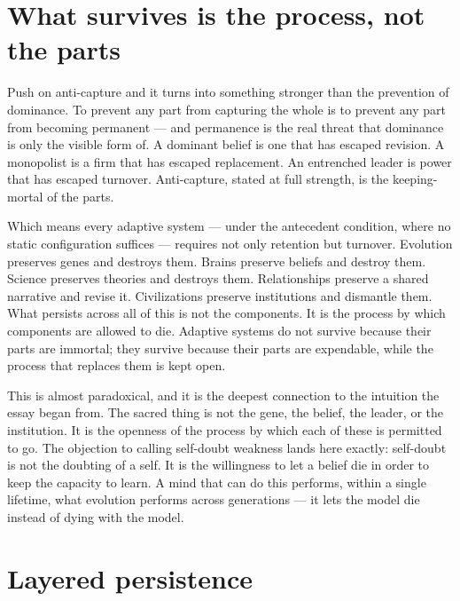 \documentclass[11pt, a4paper]{report}
\begin{document}
\section{What survives is the process, not the parts}

Push on anti-capture and it turns into something stronger than the prevention of dominance. To prevent any part from capturing the whole is to prevent any part from becoming permanent --- and permanence is the real threat that dominance is only the visible form of. A dominant belief is one that has escaped revision. A monopolist is a firm that has escaped replacement. An entrenched leader is power that has escaped turnover. Anti-capture, stated at full strength, is the keeping-mortal of the parts.

Which means every adaptive system --- under the antecedent condition, where no static configuration suffices --- requires not only retention but turnover. Evolution preserves genes and destroys them. Brains preserve beliefs and destroy them. Science preserves theories and destroys them. Relationships preserve a shared narrative and revise it. Civilizations preserve institutions and dismantle them. What persists across all of this is not the components. It is the process by which components are allowed to die. Adaptive systems do not survive because their parts are immortal; they survive because their parts are expendable, while the process that replaces them is kept open.

This is almost paradoxical, and it is the deepest connection to the intuition the essay began from. The sacred thing is not the gene, the belief, the leader, or the institution. It is the openness of the process by which each of these is permitted to go. The objection to calling self-doubt weakness lands here exactly: self-doubt is not the doubting of a self. It is the willingness to let a belief die in order to keep the capacity to learn. A mind that can do this performs, within a single lifetime, what evolution performs across generations --- it lets the model die instead of dying with the model.

\section{Layered persistence}
\end{document}

